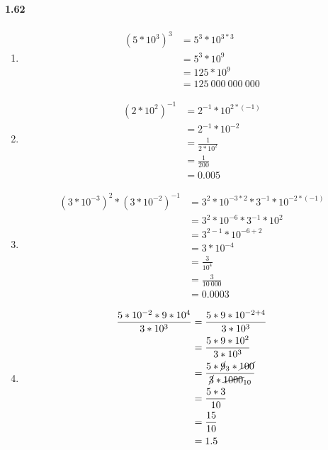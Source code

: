 \documentclass{article}
\newcommand\litem[1]{\item{\bfseries#1\space}}
\begin{document}
\paragraph{1.62}
\begin{enumerate}[label=\emph{\alph*})]
\litem{
\begin{align*}
  \left(5 * 10^3\right)^3 &= 5^3 * 10^{3*3} \\
  &= 5^3 * 10^9 \\
  &= 125 * 10^9 \\
  &= 125\:000\:000\:000
\end{align*}
}
\litem{
\begin{align*}
  \left(2 * 10^2\right)^{-1} &= 2^{-1} * 10^{2 * (-1)} \\
  &= 2^{-1} * 10^{-2} \\
  &= \frac{1}{2 * 10^2} \\
  &= \frac{1}{200} \\
  &= 0.005
\end{align*}
}
\litem{
\begin{align*}
  \left(3 * 10^{-3}\right)^2 * \left(3 * 10^{-2}\right)^{-1} &= 3^2 * 10^{-3 * 2} * 3^{-1} * 10^{-2 * (-1)} \\
  &= 3^2 * 10^{-6} * 3^{-1} * 10^2 \\
  &= 3^{2-1} * 10^{-6 + 2} \\
  &= 3 * 10^{-4} \\
  &= \frac{3}{10^4} \\
  &= \frac{3}{10\:000} \\
  &= 0.0003
\end{align*}
}
\litem{
\begin{align*}
  \frac{5 * 10^{-2} * 9 * 10^4}{3 * 10^3} &= \frac{5 * 9 * 10^{-2 + 4}}{3 * 10^3} \\
  &= \frac{5 * 9 * 10^{2}}{3 * 10^3} \\
  &= \frac{5 * \cancel{9}_3 * \cancel{100}}{\cancel{3} * \cancel{1000}_{10}} \\
  &= \frac{5 * 3}{10} \\
  &= \frac{15}{10} \\
  &= 1.5
\end{align*}
}
\end{enumerate}
\end{document}
